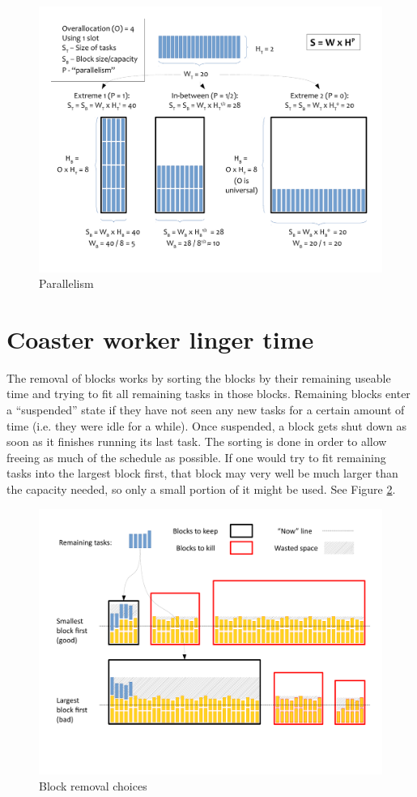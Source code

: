 \documentclass[12pt,letterpaper]{report}
\begin{document}
\begin{figure}[h]
	\center
	\includegraphics[scale=0.5]{parallelism.pdf}
	\caption{Parallelism}
	\label{f:parallelism}
\end{figure}

\section{Coaster worker linger time}

The removal of blocks works by sorting the blocks by their remaining useable time and trying to fit all remaining tasks in those blocks. Remaining blocks enter a ``suspended'' state if they have not seen any new tasks for a certain amount of time (i.e. they were idle for a while). Once suspended, a block gets shut down as soon as it finishes running its last task. The sorting is done in order to allow freeing as much of the schedule as possible. If one would try to fit remaining tasks into the largest block first, that block may very well be much larger than the capacity needed, so only a small portion of it might be used. See Figure \ref{f:linger}.

\begin{figure}[h]
	\center
	\includegraphics[scale=0.5]{linger.pdf}
	\caption{Block removal choices}
	\label{f:linger}
\end{figure}
\end{document}
